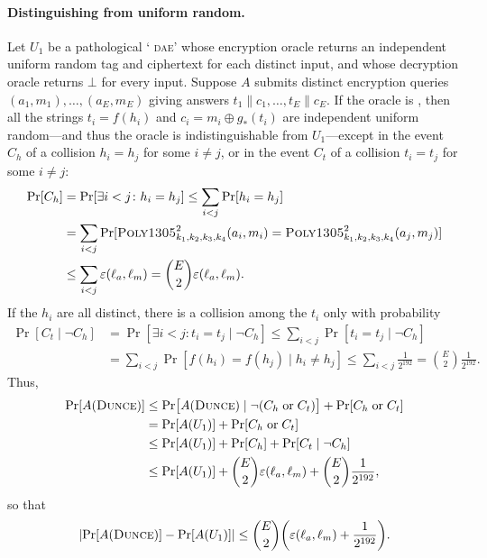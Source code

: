 \documentclass[draft]{article}
\def\operatorsc#1{{%
  \ifmmode\let\next=\operatorname\else\let\next=\relax\fi\next{\textsc{#1}}}}
\def\Poly#1/{\operatorsc{Poly#1}}
\def\DUNCE/{\operatorsc{Dunce}}
\def\DAE{%
  \ifmmode\def\next{\operatorname{DAE}}%
    \else\def\next/{\textsc{dae}}%
  \fi\next}
\newcommand{\concat}{\mathbin\|}
\newcommand{\given}{\mathrel|}
\newcommand{\collisionbound}{\varepsilon}
\begin{document}
\paragraph*{Distinguishing \DUNCE/ from uniform random.}
Let $U_1$ be a pathological `\DAE/' whose encryption oracle returns an
 independent uniform random tag and ciphertext for each distinct
 input, and whose decryption oracle returns $\bot$ for every input.
Suppose $A$ submits distinct encryption queries
 $(a_1, m_1), \dotsc, (a_E, m_E)$
 giving answers
 $t_1 \concat c_1, \dotsc, t_E \concat c_E$.
If the oracle is \DUNCE/, then all the strings $t_i = f(h_i)$ and
 $c_i = m_i \oplus g_*(t_i)$ are independent uniform random---and thus
 the oracle is indistinguishable from $U_1$---except in the event
 $C_h$ of a collision $h_i = h_j$ for some $i \ne j$, or in the event
 $C_t$ of a collision $t_i = t_j$ for some $i \ne j$:
%
\begin{align*}
  \Pr[C_h]
    &= \Pr[\exists i<j\colon h_i = h_j]
     \leq \sum_{i<j} \Pr[h_i = h_j] \\
    &= \sum_{i<j}
         \Pr[\Poly1305/^2_{k_1,k_2,k_3,k_4}(a_i, m_i)
               = \Poly1305/^2_{k_1,k_2,k_3,k_4}(a_j, m_j)] \\
    &\leq \sum_{i<j} \collisionbound(\ell_a, \ell_m)
     = \binom{E}{2} \collisionbound(\ell_a, \ell_m).
\end{align*}
%
If the $h_i$ are all distinct, there is a collision among the $t_i$
 only with probability
%
\begin{align*}
  \Pr[C_t \given \lnot C_h]
    &= \Pr[\exists i<j\colon t_i = t_j \given \lnot C_h]
     \leq \sum_{i<j} \Pr[t_i = t_j \given \lnot C_h] \\
    &= \sum_{i<j} \Pr[f(h_i) = f(h_j) \given h_i \ne h_j]
     \leq \sum_{i<j} \frac{1}{2^{192}}
     = \binom{E}{2} \frac{1}{2^{192}}.
\end{align*}
%
Thus,
%
\begin{align*}
  \Pr[A(\DUNCE/)]
  &\leq \Pr\bigl[A(\DUNCE/) \given
            \lnot (C_h \mathrel{\text{or}} C_t)\bigr]
        + \Pr[C_h \mathrel{\text{or}} C_t] \\
  &= \Pr[A(U_1)] + \Pr[C_h \mathrel{\text{or}} C_t] \\
  &\leq \Pr[A(U_1)] + \Pr[C_h] + \Pr[C_t \given \lnot C_h] \\
  &\leq \Pr[A(U_1)] + \binom{E}{2} \collisionbound(\ell_a, \ell_m)
        + \binom{E}{2} \frac{1}{2^{192}},
\end{align*}
%
 so that
\[
  \lvert\Pr[A(\DUNCE/)] - \Pr[A(U_1)]\rvert
  \leq \binom{E}{2}
       \biggl(\collisionbound(\ell_a, \ell_m) + \frac{1}{2^{192}}\biggr).
\]
\end{document}
